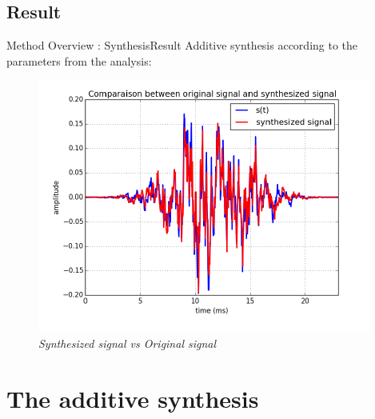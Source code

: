 \documentclass[10pt]{beamer}
\begin{document}
\subsection{Result}
\begin{frame}{Method Overview : Synthesis}{Result}
Additive synthesis according to the parameters from the analysis:
\begin{figure}
	\centerline
	{\includegraphics[scale=0.5]{synthesisstep.png}}
	\caption{\it Synthesized signal vs Original signal}
\end{figure}
\end{frame}
\section{The additive synthesis}
\end{document}
